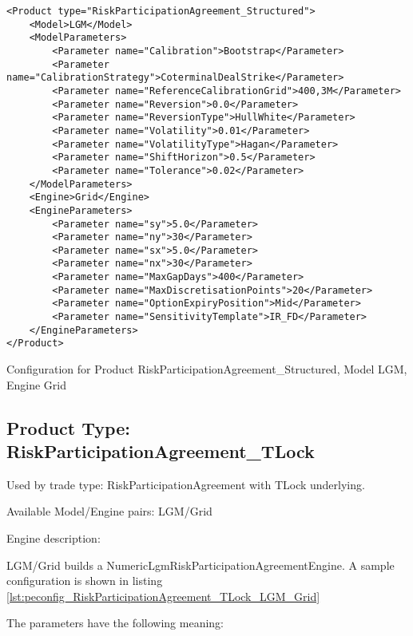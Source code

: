 \begin{longlisting}
\begin{verbatim}
<Product type="RiskParticipationAgreement_Structured">
    <Model>LGM</Model>
    <ModelParameters>
        <Parameter name="Calibration">Bootstrap</Parameter>
        <Parameter name="CalibrationStrategy">CoterminalDealStrike</Parameter>
        <Parameter name="ReferenceCalibrationGrid">400,3M</Parameter>
        <Parameter name="Reversion">0.0</Parameter>
        <Parameter name="ReversionType">HullWhite</Parameter>
        <Parameter name="Volatility">0.01</Parameter>
        <Parameter name="VolatilityType">Hagan</Parameter>
        <Parameter name="ShiftHorizon">0.5</Parameter>
        <Parameter name="Tolerance">0.02</Parameter>
    </ModelParameters>
    <Engine>Grid</Engine>
    <EngineParameters>
        <Parameter name="sy">5.0</Parameter>
        <Parameter name="ny">30</Parameter>
        <Parameter name="sx">5.0</Parameter>
        <Parameter name="nx">30</Parameter>
        <Parameter name="MaxGapDays">400</Parameter>
        <Parameter name="MaxDiscretisationPoints">20</Parameter>
        <Parameter name="OptionExpiryPosition">Mid</Parameter>
        <Parameter name="SensitivityTemplate">IR_FD</Parameter>
    </EngineParameters>
</Product>
\end{verbatim}
\caption{Configuration for Product RiskParticipationAgreement\_Structured, Model LGM, Engine Grid}
\label{lst:peconfig_RiskParticipationAgreement_Structured_LGM_Grid}
\end{longlisting}

\subsection{Product Type: RiskParticipationAgreement\_TLock}

Used by trade type: RiskParticipationAgreement with TLock underlying.

Available Model/Engine pairs: LGM/Grid

Engine description:

LGM/Grid builds a NumericLgmRiskParticipationAgreementEngine. A sample configuration is shown in listing
\ref{lst:peconfig_RiskParticipationAgreement_TLock_LGM_Grid}

The parameters have the following meaning:

